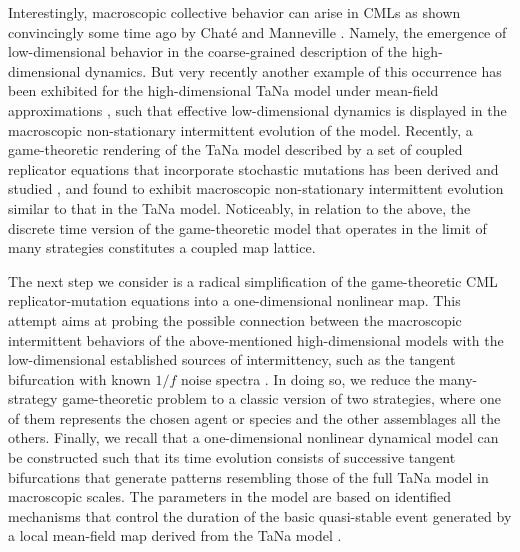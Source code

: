 \documentclass[12pt]{article}
\begin{document}
Interestingly, macroscopic collective behavior can arise in CMLs as shown convincingly some time ago by Chat{\'e} and Manneville \cite{Chate_Manneville_1992}. Namely, the emergence of low-dimensional behavior in the coarse-grained description of the high-dimensional dynamics. But very recently another example of this occurrence has been exhibited for the high-dimensional TaNa model under mean-field approximations \cite{ADR_HJJ_DP_AR1}, such that effective low-dimensional dynamics is displayed in the macroscopic non-stationary intermittent evolution of the model. Recently, a game-theoretic rendering of the TaNa model described by a set of coupled replicator equations that incorporate stochastic mutations has been derived and studied \cite{DP_JG_HJJ_2016}, and found to exhibit macroscopic non-stationary intermittent evolution similar to that in the TaNa model. Noticeably, in relation to the above, the discrete time version of the game-theoretic model that operates in the limit of many strategies constitutes a coupled map lattice.   

The next step we consider is a radical simplification of the game-theoretic CML replicator-mutation equations into a one-dimensional nonlinear map. This attempt aims at probing the possible connection between the macroscopic intermittent behaviors of the above-mentioned high-dimensional models with the low-dimensional established sources of intermittency, such as the tangent bifurcation \cite{schuster1} with known $1/f$ noise spectra \cite{schuster2}. In doing so, we reduce the many-strategy game-theoretic problem to a classic version of two strategies, where one of them represents the chosen agent or species and the other assemblages all the others. Finally, we recall that a one-dimensional nonlinear dynamical model can be constructed \cite{ADR_HJJ_DP_AR1} such that its time evolution consists of successive tangent bifurcations that generate patterns resembling those of the full TaNa model in macroscopic scales. The parameters in the model are based on identified mechanisms that control the duration of the basic quasi-stable event generated by a local mean-field map derived from the TaNa model \cite{ADR_HJJ_DP_AR1}.

\end{document}
